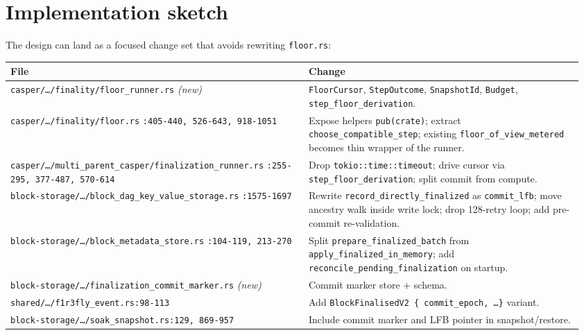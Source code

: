 \documentclass[11pt]{article}
\newcommand{\code}[1]{\texttt{#1}}
\begin{document}
\section{Implementation sketch}

The design can land as a focused change set that avoids rewriting
\code{floor.rs}:

\begin{center}\small
\begin{tabular}{@{}p{0.50\linewidth}p{0.46\linewidth}@{}}
\toprule
\textbf{File} & \textbf{Change} \\
\midrule
\code{casper/\ldots/finality/floor\_runner.rs} \emph{(new)} &
\code{FloorCursor}, \code{StepOutcome}, \code{SnapshotId},
\code{Budget}, \code{step\_floor\_derivation}. \\

\code{casper/\ldots/finality/floor.rs}
\code{:405-440, 526-643, 918-1051} &
Expose helpers \code{pub(crate)}; extract
\code{choose\_compatible\_step}; existing
\code{floor\_of\_view\_metered} becomes thin wrapper of the runner. \\

\code{casper/\ldots/multi\_parent\_casper/finalization\_runner.rs}
\code{:255-295, 377-487, 570-614} &
Drop \code{tokio::time::timeout}; drive cursor via
\code{step\_floor\_derivation}; split commit from compute. \\

\code{block-storage/\ldots/block\_dag\_key\_value\_storage.rs}
\code{:1575-1697} &
Rewrite \code{record\_directly\_finalized} as \code{commit\_lfb};
move ancestry walk inside write lock; drop 128-retry loop; add
pre-commit re-validation. \\

\code{block-storage/\ldots/block\_metadata\_store.rs}
\code{:104-119, 213-270} &
Split \code{prepare\_finalized\_batch} from
\code{apply\_finalized\_in\_memory}; add
\code{reconcile\_pending\_finalization} on startup. \\

\code{block-storage/\ldots/finalization\_commit\_marker.rs}
\emph{(new)} &
Commit marker store + schema. \\

\code{shared/\ldots/f1r3fly\_event.rs:98-113} &
Add \code{BlockFinalisedV2 \{ commit\_epoch, \ldots \}} variant. \\

\code{block-storage/\ldots/soak\_snapshot.rs:129, 869-957} &
Include commit marker and LFB pointer in snapshot/restore. \\
\bottomrule
\end{tabular}
\end{center}
\end{document}
